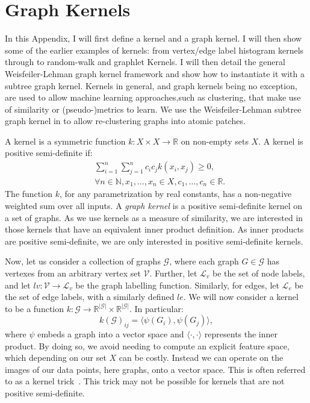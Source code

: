 \chapter{Graph Kernels}
\label{appendix:graph_kernels}

In this Appendix, I will first define a kernel and a graph kernel. I will then
show some of the earlier examples of kernels: from vertex/edge label histogram
kernels through to random-walk and graphlet Kernels. I will then detail the
general Weisfeiler-Lehman graph kernel framework and show how to instantiate it
with a subtree graph kernel. Kernels in general, and graph kernels being no
exception, are used to allow machine learning approaches,such as clustering,
that make use of similarity or (pseudo-)metrics to learn. We use the
Weisfeiler-Lehman subtree graph kernel in  to allow
re-clustering \deltaPDGN graphs into atomic patches.

A kernel is a symmetric function $k: X \times X \rightarrow \mathbb{R}$ on
non-empty sets $X$. A kernel is positive semi-definite if:
\begin{align*}
	&\sum_{i=1}^{n} \sum_{j=1}^{n} c_i c_j k(x_i, x_j) \geq 0, \\
	&\forall n \in \mathbb{N}, x_1, \ldots, x_n \in X, c_1, \ldots, c_n \in \mathbb{R}. 
\end{align*}
The function $k$, for any
parametrization by real constants, has a non-negative weighted sum over all
inputs. A \emph{graph kernel} is a positive semi-definite kernel on a set of
graphs. As we use kernels as a measure of similarity, we are interested in those
kernels that have an equivalent inner product definition. As inner products are
positive semi-definite, we are only interested in positive semi-definite
kernels.

Now, let us consider a collection of graphs $\mathcal{G}$, where each graph $G
\in \mathcal{G}$ has vertexes from an arbitrary vertex set $\mathcal{V}$.
Further, let $\mathcal{L}_v$ be the set of node labels, and let $lv:
\mathcal{V} \rightarrow \mathcal{L}_v$ be the graph labelling function.
Similarly, for edges, let $\mathcal{L}_e$ be the set of edge labels, with a
similarly defined $le$. We will now consider a kernel to be a function
$k: \mathcal{G} \rightarrow \mathbb{R}^{|\mathcal{G}|} \times
\mathbb{R}^{|\mathcal{G}|}$. In particular:
\begin{equation}
\label{eq:kernel_general}
    k(\mathcal{G})_{ij} = \langle\psi(G_i), \psi(G_j)\rangle,
\end{equation}
%
where $\psi$ embeds a graph into a vector space and $\langle\cdot,\cdot\rangle$
represents the inner product. By doing so, we avoid needing to compute an
explicit feature space, which depending on our set $X$ can be costly. Instead we
can operate on the images of our data points, here graphs, onto a vector space.
This is often referred to as a kernel trick~\cite{theodoridis2008}. This trick
may not be possible for kernels that are not positive semi-definite.

